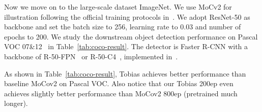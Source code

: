 \documentclass[letterpaper]{article}
\begin{document}
Now we move on to the large-scale dataset ImageNet. We use MoCv2 for illustration following the official training protocols in~\citep{mocov2:xinlei:arxiv2020}. We adopt ResNet-50 as backbone and set the batch size to 256, learning rate to 0.03 and number of epochs to 200. We study the downstream object detection performance on Pascal VOC 07\&12~\citep{VOC:mark:IJCV10} in Table~\ref{tab:coco-result}. The detector is Faster R-CNN with a backbone of R-50-FPN~\citep{FPN:kaiming:CVPR17} or R-50-C4~\citep{mask-rcnn:he:ICCV17}, implemented in~\citep{wu2019detectron2}.

As shown in Table~\ref{tab:coco-result}, Tobias achieves better performance than baseline MoCov2 on Pascal VOC. Also notice that our Tobias 200ep even achieves slightly better performance than MoCov2 800ep (pretrained much longer).
\end{document}
